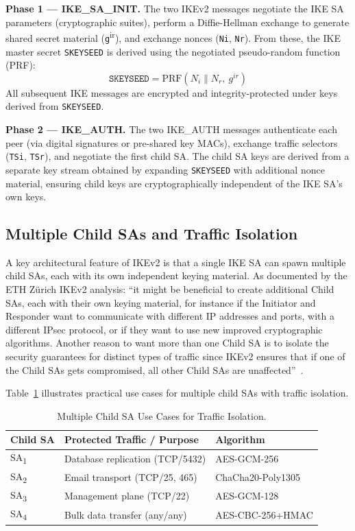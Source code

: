\documentclass[sigconf,nonacm]{acmart}
\begin{document}
\textbf{Phase 1 --- IKE\_SA\_INIT.} The two IKEv2 messages negotiate the IKE SA
parameters (cryptographic suites), perform a Diffie-Hellman exchange to generate
shared secret material (\texttt{g}\textsuperscript{ir}), and exchange nonces
(\texttt{Ni}, \texttt{Nr}). From these, the IKE master secret \texttt{SKEYSEED} is
derived using the negotiated pseudo-random function (PRF):
\[
  \texttt{SKEYSEED} = \mathrm{PRF}(N_i \mathbin\| N_r,\ g^{ir})
\]
All subsequent IKE messages are encrypted and integrity-protected under keys derived
from \texttt{SKEYSEED}.

\textbf{Phase 2 --- IKE\_AUTH.} The two IKE\_AUTH messages authenticate each peer
(via digital signatures or pre-shared key MACs), exchange traffic selectors
(\texttt{TSi}, \texttt{TSr}), and negotiate the first child SA. The child SA keys
are derived from a separate key stream obtained by expanding \texttt{SKEYSEED} with
additional nonce material, ensuring child keys are cryptographically independent
of the IKE SA's own keys.

\subsection{Multiple Child SAs and Traffic Isolation}

A key architectural feature of IKEv2 is that a single IKE SA can spawn multiple
child SAs, each with its own independent keying material. As documented by the ETH
Zürich IKEv2 analysis: ``it might be beneficial to create additional Child SAs, each
with their own keying material, for instance if the Initiator and Responder want to
communicate with different IP addresses and ports, with a different IPsec protocol,
or if they want to use new improved cryptographic algorithms. Another reason to want
more than one Child SA is to isolate the security guarantees for distinct types of
traffic since IKEv2 ensures that if one of the Child SAs gets compromised, all other
Child SAs are unaffected''~\cite{ethz}.

Table~\ref{tab:child_sa_examples} illustrates practical use cases for multiple child
SAs with traffic isolation.

\begin{table}[h]
\caption{Multiple Child SA Use Cases for Traffic Isolation.}
\label{tab:child_sa_examples}
\small
\begin{tabularx}{\columnwidth}{@{}p{1.7cm}X p{1.5cm}@{}}
\toprule
\textbf{Child SA} & \textbf{Protected Traffic / Purpose} & \textbf{Algorithm} \\
\midrule
SA\textsubscript{1} & Database replication (TCP/5432) & AES-GCM-256 \\
SA\textsubscript{2} & Email transport (TCP/25, 465) & ChaCha20-Poly1305 \\
SA\textsubscript{3} & Management plane (TCP/22) & AES-GCM-128 \\
SA\textsubscript{4} & Bulk data transfer (any/any) & AES-CBC-256+HMAC \\
\bottomrule
\end{tabularx}
\end{table}
\end{document}
